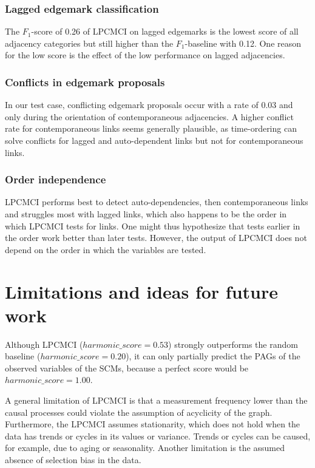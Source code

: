 \documentclass[conference]{IEEEtran}
\begin{document}
\subsubsection{Lagged edgemark classification}
The $F_1$-score of 0.26 of LPCMCI on lagged edgemarks is the lowest score of all adjacency categories but still higher than the $F_1$-baseline with 0.12.
One reason for the low score is the effect of the low performance on lagged adjacencies.

\subsubsection{Conflicts in edgemark proposals}
In our test case, conflicting edgemark proposals occur with a rate of 0.03 and only during the orientation of contemporaneous adjacencies. A higher conflict rate for contemporaneous links seems generally plausible, as time-ordering can solve conflicts for lagged and auto-dependent links but not for contemporaneous links.

\subsubsection{Order independence}
LPCMCI performs best to detect auto-dependencies, then contemporaneous links and struggles most with lagged links, which also happens to be the order in which LPCMCI tests for links. One might thus hypothesize that tests earlier in the order work better than later tests. However, the output of LPCMCI does not depend on the order in which the variables are tested\cite{gerhardus_high-recall_2021}.


\section{Limitations and ideas for future work}
Although LPCMCI ($harmonic\_score=0.53$) strongly outperforms the random baseline ($harmonic\_score=0.20$), it can only partially predict the PAGs of the observed variables of the SCMs, because a perfect score would be $harmonic\_score=1.00$.

A general limitation of LPCMCI is that a measurement frequency lower than the causal processes could violate the assumption of acyclicity of the graph. 
Furthermore, the LPCMCI assumes stationarity, which does not hold when the data has trends or cycles in its values or variance. Trends or cycles can be caused, for example, due to aging or seasonality. 
Another limitation is the assumed absence of selection bias in the data.
\end{document}
